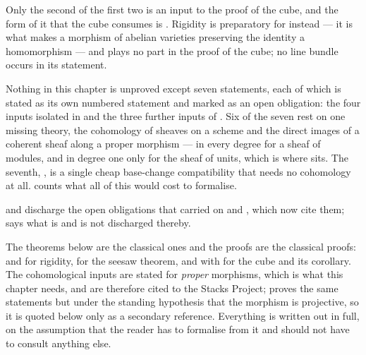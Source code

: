 Only the second of the first two is an input to the proof of the cube, and the
form of it that the cube consumes is .
Rigidity is preparatory for  instead --- it is what makes
a morphism of abelian varieties preserving the identity a homomorphism --- and
plays no part in the proof of the cube; no line bundle occurs in its statement.

Nothing in this chapter is unproved except seven statements, each of which is
stated as its own numbered statement and marked as an open obligation: the
four inputs isolated in  and the three further inputs of
.  Six of the seven rest on one missing theory, the
cohomology of sheaves on a scheme and the direct images of a coherent sheaf
along a proper morphism --- in every degree for a sheaf of modules, and in
degree one only for the sheaf of units, which is where
 sits.  The seventh,
, is a single cheap
base-change compatibility that needs no cohomology at all.
 counts what all of this would cost to formalise.

 and  discharge the open
obligations that  carried on  and
, which now cite them; 
says what is and is not discharged thereby.

The theorems below are the classical ones and the proofs are the classical
proofs: \cite[\S4]{MumfordAbelianVarieties} and
\cite[I, \S1]{MilneAbelianVarieties} for rigidity,
\cite[\S5]{MumfordAbelianVarieties} for the seesaw theorem, and
\cite[\S6]{MumfordAbelianVarieties} with
\cite[I, \S\S5--7]{MilneAbelianVarieties} for the cube and its corollary.
The
cohomological inputs are stated for \emph{proper} morphisms, which is what
this chapter needs, and are therefore cited to the Stacks Project;
\cite[III, \S12]{Hartshorne} proves the same statements but under the
standing hypothesis that the morphism is projective, so it is quoted below
only as a secondary reference.  Everything is written out in full, on the
assumption that the reader has to formalise from it and should not have to
consult anything else.


